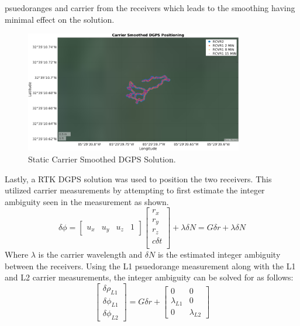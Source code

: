 \documentclass[11pt]{article}
\begin{document}
\begin{enumerate}[label=\textbf{\arabic*.}]
    psuedoranges  and carrier from the receivers which leads to the smoothing having 
    minimal effect on the solution.
    \begin{figure}[H]
      \centering
      \includegraphics[width=0.85\textwidth]{p2_c.png}
      \caption{Static Carrier Smoothed DGPS Solution.}
    \end{figure}
    Lastly, a RTK DGPS solution was used to position the two receivers. This utilized 
    carrier measurements by attempting to first estimate the integer ambiguity seen in 
    the measurement as shown.
    \begin{equation}
      \delta \phi = 
      \begin{bmatrix}
        u_x & u_y & u_z & 1
      \end{bmatrix}
      \begin{bmatrix}
        r_x \\ r_y \\ r_z \\ c \delta t \\
      \end{bmatrix}
      + \lambda \delta N
      = G \delta r + \lambda \delta N
    \end{equation}
    Where $\lambda$ is the carrier wavelength and $\delta N$ is the estimated integer 
    ambiguity between the receivers. Using the L1 psuedorange measurement along with 
    the L1 and L2 carrier measurements, the integer ambiguity can be solved for as 
    follows:
    \begin{equation}
      \begin{bmatrix}
        \delta \rho_{L1} \\ \delta \phi_{L1} \\ \delta \phi_{L2}
      \end{bmatrix}
      =
      G \delta r +
      \begin{bmatrix}
        0 & 0 \\ \lambda_{L1} & 0 \\ 0 & \lambda_{L2}

\end{bmatrix}
\end{equation}
\end{enumerate}
\end{document}
